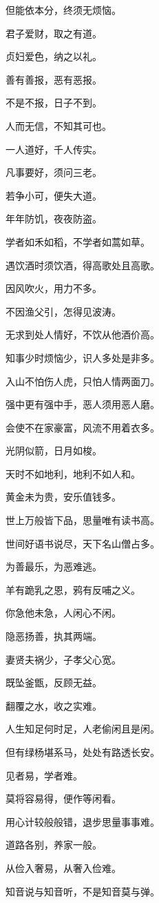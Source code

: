 \documentclass[12pt,oneside]{book}
\begin{document}
但能依本分，终须无烦恼。

君子爱财，取之有道。

贞妇爱色，纳之以礼。

善有善报，恶有恶报。

不是不报，日子不到。

人而无信，不知其可也。

一人道好，千人传实。

凡事要好，须问三老。

若争小可，便失大道。

年年防饥，夜夜防盗。

学者如禾如稻，不学者如蒿如草。

遇饮酒时须饮酒，得高歌处且高歌。

因风吹火，用力不多。

不因渔父引，怎得见波涛。

无求到处人情好，不饮从他酒价高。

知事少时烦恼少，识人多处是非多。

入山不怕伤人虎，只怕人情两面刀。

强中更有强中手，恶人须用恶人磨。

会使不在家豪富，风流不用着衣多。

光阴似箭，日月如梭。

天时不如地利，地利不如人和。

黄金未为贵，安乐值钱多。

世上万般皆下品，思量唯有读书高。

世间好语书说尽，天下名山僧占多。

为善最乐，为恶难逃。

羊有跪乳之恩，鸦有反哺之义。

你急他未急，人闲心不闲。

隐恶扬善，执其两端。

妻贤夫祸少，子孝父心宽。

既坠釜甑，反顾无益。

翻覆之水，收之实难。

人生知足何时足，人老偷闲且是闲。

但有绿杨堪系马，处处有路透长安。

见者易，学者难。

莫将容易得，便作等闲看。

用心计较般般错，退步思量事事难。

道路各别，养家一般。

从俭入奢易，从奢入俭难。

知音说与知音听，不是知音莫与弹。
\end{document}
